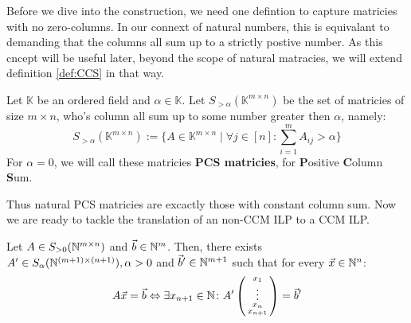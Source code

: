 Before we dive into the construction, we need one defintion to capture matricies with no zero-columns. In our connext of natural numbers, this is equivalant to demanding that the columns all sum up to a strictly postive number. As this cncept will be useful later, beyond the scope of natural matracies, we will extend definition \ref{def:CCS} in that way.

\begin{definition}
    \label{def:PCS}
    Let $\mathbb{K}$ be an ordered field and $\alpha \in \mathbb{K}$. Let $S_{>\alpha}(\mathbb{K}^{m \times n})$ be the set of matricies of size $m \times n$, who's column all sum up to some number greater then $\alpha$, namely:
    $$S_{>\alpha}(\mathbb{K}^{m \times n}) := \{A \in \mathbb{K}^{m \times n}\mid \forall j \in [n]\colon \sum_{i=1}^{m} A_{ij} > \alpha\}$$
    For $\alpha = 0$, we will call these matricies \textbf{PCS matricies}, for \textbf{P}ositive \textbf{C}olumn \textbf{S}um.
\end{definition}

Thus natural PCS matricies are excactly those with constant column sum. Now we are ready to tackle the translation of an non-CCM ILP to a CCM ILP.

\begin{theorem}
    \label{theorem:column_sum_construction}
    Let $A\in S_{>0}(\mathbb{N}^{m \times n})$ and $\vec b \in \mathbb{N}^m$. Then, there exists $A' \in S_\alpha(\mathbb{N}^{(m+1) \times (n+1)}), \alpha > 0$ and $\vec b' \in \mathbb{N}^{m+1}$ such that for every $\vec x \in \mathbb{N}^n$:
    $$A\vec x = \vec b \Leftrightarrow \exists x_{n+1}\in \mathbb{N}\colon A' \left(\begin{smallmatrix}
        x_1\\
        \vdots\\
        x_n\\
        x_{n+1}
    \end{smallmatrix}\right) = \vec b'$$
\end{theorem}

